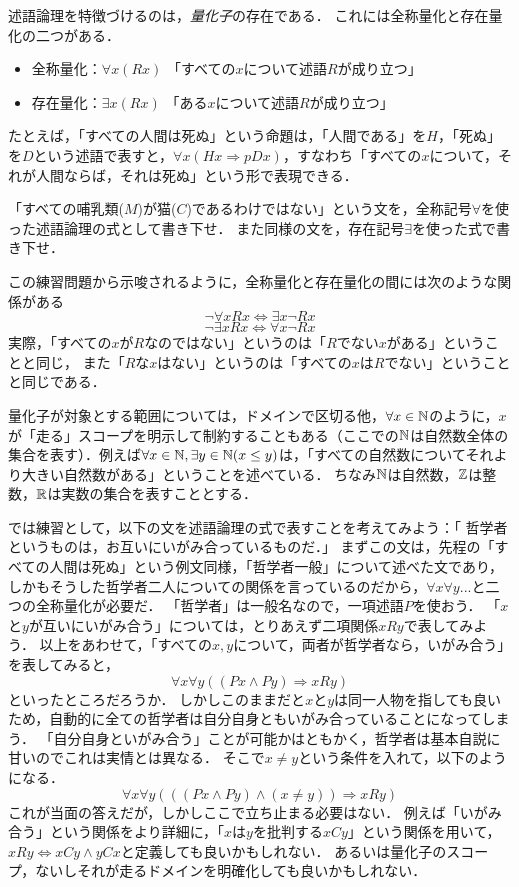 \documentclass[11pt,a4paper]{jsarticle}
\begin{document}
述語論理を特徴づけるのは，\emph{量化子}の存在である．
これには全称量化と存在量化の二つがある．
\begin{itemize}
 \item 全称量化：$\forall x (Rx)$ 「すべての$x$について述語$R$が成り立つ」
 \item 存在量化：$\exists x (Rx)$ 「ある$x$について述語$R$が成り立つ」
\end{itemize}
たとえば，「すべての人間は死ぬ」という命題は，「人間である」を$H$，「死ぬ」を$D$という述語で表すと，$\forall x (Hx \Rightarrow pDx)$，すなわち「すべての$x$について，それが人間ならば，それは死ぬ」という形で表現できる．

\begin{exercise}
    「すべての哺乳類($M$)が猫($C$)であるわけではない」という文を，全称記号$\forall$を使った述語論理の式として書き下せ．    また同様の文を，存在記号$\exists$を使った式で書き下せ．
\end{exercise}

この練習問題から示唆されるように，全称量化と存在量化の間には次のような関係がある
\[ \neg \forall x Rx \iff \exists x \neg Rx \]
\[ \neg \exists x Rx \iff \forall x \neg Rx \]
実際，「すべての$x$が$R$なのではない」というのは「$R$でない$x$がある」ということと同じ，
また「$R$な$x$はない」というのは「すべての$x$は$R$でない」ということと同じである．

量化子が対象とする範囲については，ドメインで区切る他，$\forall x \in \mathbb{N}$のように，$x$が「走る」スコープを明示して制約することもある（ここでの$\mathbb{N}$は自然数全体の集合を表す）．例えば$\forall x \in \mathbb{N}, \exists y \in \mathbb{N} (x \leq y)$は，「すべての自然数についてそれより大きい自然数がある」ということを述べている．
ちなみ$\mathbb{N}$は自然数，$\mathbb{Z}$は整数，$\mathbb{R}$は実数の集合を表すこととする．

では練習として，以下の文を述語論理の式で表すことを考えてみよう：「 哲学者というものは，お互いにいがみ合っているものだ．」
まずこの文は，先程の「すべての人間は死ぬ」という例文同様，「哲学者一般」について述べた文であり，しかもそうした哲学者二人についての関係を言っているのだから，$\forall x \forall y...$と二つの全称量化が必要だ．
「哲学者」は一般名なので，一項述語$P$を使おう．
「$x$と$y$が互いにいがみ合う」については，とりあえず二項関係$xRy$で表してみよう．
以上をあわせて，「すべての$x, y$について，両者が哲学者なら，いがみ合う」を表してみると，
\begin{equation}
 \forall x \forall y ((Px \wedge Py) \Rightarrow xRy)
\end{equation}
といったところだろうか．
しかしこのままだと$x$と$y$は同一人物を指しても良いため，自動的に全ての哲学者は自分自身ともいがみ合っていることになってしまう．
「自分自身といがみ合う」ことが可能かはともかく，哲学者は基本自説に甘いのでこれは実情とは異なる．
そこで$x \neq y$という条件を入れて，以下のようになる．
\begin{equation}
 \forall x \forall y (((Px \wedge Py) \wedge (x \neq y)) \Rightarrow xRy)
\end{equation}
これが当面の答えだが，しかしここで立ち止まる必要はない．
例えば「いがみ合う」という関係をより詳細に，「$x$は$y$を批判する$xCy$」という関係を用いて，$xRy \Leftrightarrow xCy \wedge yCx$と定義しても良いかもしれない．
あるいは量化子のスコープ，ないしそれが走るドメインを明確化しても良いかもしれない．
\end{document}
